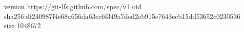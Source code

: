 version https://git-lfs.github.com/spec/v1
oid sha256:df240987f4e68a656da63ec6f349a7ded2eb915e7643ecb15dd53652c0230536
size 1048672
